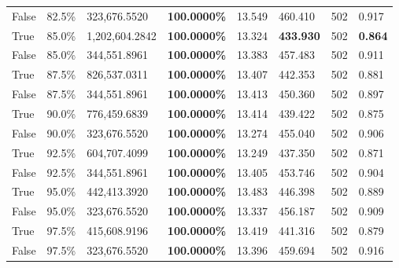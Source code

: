 \begin{table}[H]
\begin{tabular}{lllrllll}
\cline{1-8}
False & 82.5\% & 323,676.5520 & \bfseries \color{red} 100.0000\% & 13.549 & 460.410 & 502 & 0.917 \\
\cline{1-8}
True & 85.0\% & 1,202,604.2842 & \bfseries \color{red} 100.0000\% & 13.324 & \bfseries \color{red} 433.930 & 502 & \bfseries \color{red} 0.864 \\
\cline{1-8}
False & 85.0\% & 344,551.8961 & \bfseries \color{red} 100.0000\% & 13.383 & 457.483 & 502 & 0.911 \\
\cline{1-8}
True & 87.5\% & 826,537.0311 & \bfseries \color{red} 100.0000\% & 13.407 & 442.353 & 502 & 0.881 \\
\cline{1-8}
False & 87.5\% & 344,551.8961 & \bfseries \color{red} 100.0000\% & 13.413 & 450.360 & 502 & 0.897 \\
\cline{1-8}
True & 90.0\% & 776,459.6839 & \bfseries \color{red} 100.0000\% & 13.414 & 439.422 & 502 & 0.875 \\
\cline{1-8}
False & 90.0\% & 323,676.5520 & \bfseries \color{red} 100.0000\% & 13.274 & 455.040 & 502 & 0.906 \\
\cline{1-8}
True & 92.5\% & 604,707.4099 & \bfseries \color{red} 100.0000\% & 13.249 & 437.350 & 502 & 0.871 \\
\cline{1-8}
False & 92.5\% & 344,551.8961 & \bfseries \color{red} 100.0000\% & 13.405 & 453.746 & 502 & 0.904 \\
\cline{1-8}
True & 95.0\% & 442,413.3920 & \bfseries \color{red} 100.0000\% & 13.483 & 446.398 & 502 & 0.889 \\
\cline{1-8}
False & 95.0\% & 323,676.5520 & \bfseries \color{red} 100.0000\% & 13.337 & 456.187 & 502 & 0.909 \\
\cline{1-8}
True & 97.5\% & 415,608.9196 & \bfseries \color{red} 100.0000\% & 13.419 & 441.316 & 502 & 0.879 \\
\cline{1-8}
False & 97.5\% & 323,676.5520 & \bfseries \color{red} 100.0000\% & 13.396 & 459.694 & 502 & 0.916 \\
\cline{1-8}
\bottomrule
\end{tabular}
\end{table}
